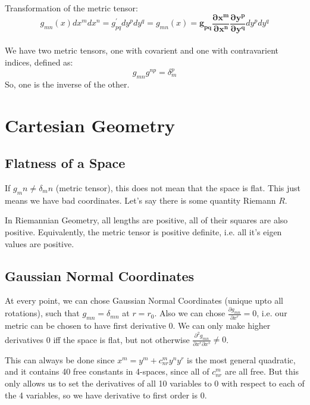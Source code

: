 Transformation of the metric tensor:
\begin{equation}
  g_{mn}(x) dx^m dx^n = g_{pq}^\prime dy^p dy^q = g_{mn}(x) = \mathbf{g_{pq} \frac{\partial x^m}{\partial x^n} \frac{\partial y^p}{\partial y^q}} dy^p dy^q
\end{equation}

\paragraph{} We have two metric tensors, one with covarient and one with contravarient indices, defined as:
\begin{equation}
  g_{mn} g^{np} = \delta_m^p
\end{equation}
So, one is the inverse of the other.



\section{Cartesian Geometry}


\subsection{Flatness of a Space}

If $g_mn \neq \delta_mn$ (metric tensor), this does not mean that the space is flat. This just means we have bad coordinates. Let's say there is some quantity Riemann $R$.

In Riemannian Geometry, all lengths are positive, all of their squares are also positive. Equivalently, the metric tensor is positive definite, i.e. all it's eigen values are positive.


\subsection{Gaussian Normal Coordinates}

At every point, we can chose Gaussian Normal Coordinates (unique upto all rotations), such that $g_{mn} = \delta_{mn}$ at $r = r_0$. Also we can chose $\frac{\partial g_{mn}}{\partial x^r} = 0$, i.e. our metric can be chosen to have first derivative 0. We can only make higher derivatives 0 iff the space is flat, but not otherwise $\frac{\partial^2 g_{mn}}{\partial x^r \partial x^s} \neq 0$.

This can always be done since $x^m = y^m + c^m_{nr} y^n y^r$ is the most general quadratic, and it contains 40 free constants in 4-spaces, since all of $c^m_{nr}$ are all free. But this only allows us to set the derivatives of all 10 variables to 0 with respect to each of the 4 variables, so we have derivative to first order is 0.

